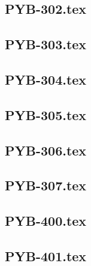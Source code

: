 \renewcommand{\xxexo}{PYB-302.tex} 
\subsection*{\xxexo} 
\graphicspath{{../../exos/python_bases/PYB-302/}}
 
 
\renewcommand{\xxexo}{PYB-303.tex} 
\subsection*{\xxexo} 
\graphicspath{{../../exos/python_bases/PYB-303/}}
 
 
\renewcommand{\xxexo}{PYB-304.tex} 
\subsection*{\xxexo} 
\graphicspath{{../../exos/python_bases/PYB-304/}}
 
 
\renewcommand{\xxexo}{PYB-305.tex} 
\subsection*{\xxexo} 
\graphicspath{{../../exos/python_bases/PYB-305/}}
 
 
\renewcommand{\xxexo}{PYB-306.tex} 
\subsection*{\xxexo} 
\graphicspath{{../../exos/python_bases/PYB-306/}}
 
 
\renewcommand{\xxexo}{PYB-307.tex} 
\subsection*{\xxexo} 
\graphicspath{{../../exos/python_bases/PYB-307/}}
 
 
\renewcommand{\xxexo}{PYB-400.tex} 
\subsection*{\xxexo} 
\graphicspath{{../../exos/python_bases/PYB-400/}}
 
 
\renewcommand{\xxexo}{PYB-401.tex} 
\subsection*{\xxexo} 
\graphicspath{{../../exos/python_bases/PYB-401/}}
 
 
